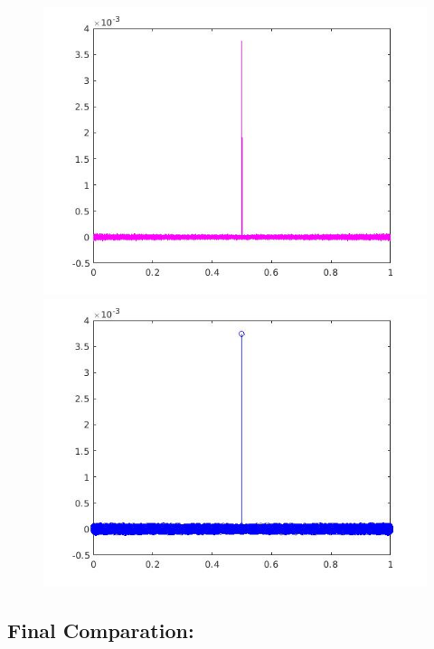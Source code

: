 \documentclass[a4paper,11pt]{article}
\begin{document}
\begin{figure}[!hp]
\centering
\begin{minipage}{.5\textwidth}
  \centering
  \includegraphics[width=1\linewidth]{images/lab1_40.jpg}
\end{minipage}%
\begin{minipage}{.5\textwidth}
  \centering
  \includegraphics[width=1\linewidth]{images/lab1_41.jpg}
\end{minipage}
\end{figure}

\newpage

\subsection{Final Comparation:}
\end{document}
